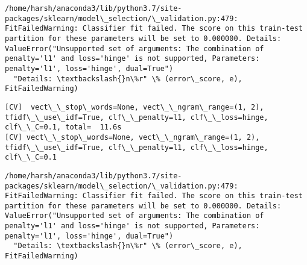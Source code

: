 \documentclass[11pt]{article}
\begin{document}
    \begin{Verbatim}[commandchars=\\\{\}]
/home/harsh/anaconda3/lib/python3.7/site-packages/sklearn/model\_selection/\_validation.py:479: FitFailedWarning: Classifier fit failed. The score on this train-test partition for these parameters will be set to 0.000000. Details: 
ValueError("Unsupported set of arguments: The combination of penalty='l1' and loss='hinge' is not supported, Parameters: penalty='l1', loss='hinge', dual=True")
  "Details: \textbackslash{}n\%r" \% (error\_score, e), FitFailedWarning)

    \end{Verbatim}

    \begin{Verbatim}[commandchars=\\\{\}]
[CV]  vect\_\_stop\_words=None, vect\_\_ngram\_range=(1, 2), tfidf\_\_use\_idf=True, clf\_\_penalty=l1, clf\_\_loss=hinge, clf\_\_C=0.1, total=  11.6s
[CV] vect\_\_stop\_words=None, vect\_\_ngram\_range=(1, 2), tfidf\_\_use\_idf=True, clf\_\_penalty=l1, clf\_\_loss=hinge, clf\_\_C=0.1 

    \end{Verbatim}

    \begin{Verbatim}[commandchars=\\\{\}]
/home/harsh/anaconda3/lib/python3.7/site-packages/sklearn/model\_selection/\_validation.py:479: FitFailedWarning: Classifier fit failed. The score on this train-test partition for these parameters will be set to 0.000000. Details: 
ValueError("Unsupported set of arguments: The combination of penalty='l1' and loss='hinge' is not supported, Parameters: penalty='l1', loss='hinge', dual=True")
  "Details: \textbackslash{}n\%r" \% (error\_score, e), FitFailedWarning)

    \end{Verbatim}
\end{document}
